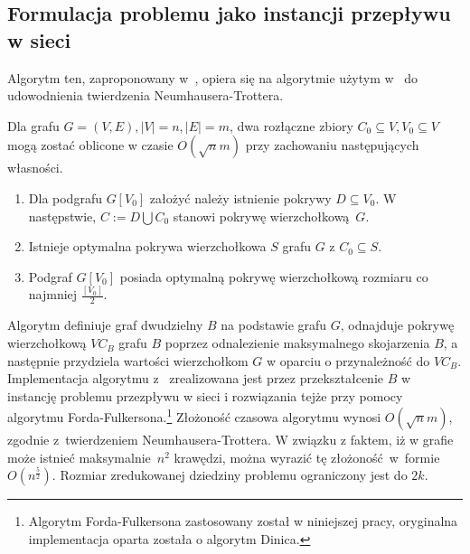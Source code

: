 \subsection{Formulacja problemu jako instancji przepływu w sieci}\label{Kernelization_network_flow}
Algorytm ten, zaproponowany w~\cite{KernelizationAlgorithms04}, opiera się na
algorytmie użytym w~\cite{Niedermeier02} do udowodnienia twierdzenia
Neumhausera-Trottera.

\begin{theorem}
  Dla grafu $G=(V,E), |V|=n, |E|=m$, dwa rozłączne zbiory $C_0 \subseteq V,
  V_0 \subseteq V$ mogą zostać oblicone w czasie $O(\sqrt{n}m)$ przy zachowaniu
  następujących własności.
  \begin{enumerate}
    \item Dla podgrafu $G[V_0]$ założyć należy istnienie pokrywy $D \subseteq
      V_0$. W następstwie, $C := D \bigcup C_0$ stanowi pokrywę wierzchołkową~$G$.
    \item Istnieje optymalna pokrywa wierzchołkowa $S$ grafu $G$ z $C_0
      \subseteq S$.
    \item Podgraf $G[V_0]$ posiada optymalną pokrywę wierzchołkową rozmiaru co
      najmniej $\frac{[V_0]}{2}$. 
  \end{enumerate}
\end{theorem}

Algorytm definiuje graf dwudzielny $B$ na podstawie grafu $G$, odnajduje pokrywę
wierzchołkową $VC_B$ grafu $B$ poprzez odnalezienie maksymalnego skojarzenia $B$,
a następnie przydziela wartości wierzchołkom $G$ w oparciu o przynależność do
$VC_B$.
Implementacja algorytmu z~\cite{Niedermeier02} zrealizowana jest przez
przekształcenie $B$ w instancję problemu przezpływu w sieci i rozwiązania tejże
przy pomocy algorytmu Forda-Fulkersona.\footnote{Algorytm Forda-Fulkersona
  zastosowany został w niniejszej pracy, oryginalna implementacja oparta została
o algorytm Dinica.}
Złożoność czasowa algorytmu wynosi $O(\sqrt{n}m)$, zgodnie z~twierdzeniem
Neumhausera-Trottera. 
W związku z faktem, iż w grafie może istnieć maksymalnie~$n^2$ krawędzi, można
wyrazić tę złożoność~w~formie $O(n^\frac{5}{2})$.
Rozmiar zredukowanej dziedziny problemu ograniczony jest do $2k$.

